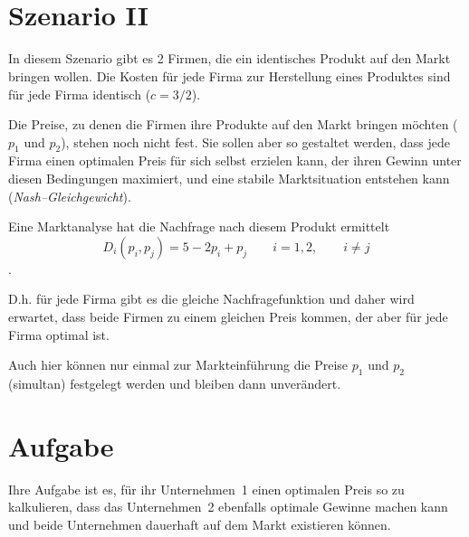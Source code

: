 \documentclass[paper=a4,notitlepage,parskip=half,plainheadsepline]{scrartcl}
\newif\ifloesung
\begin{document}
        \begin{tcolorbox}[toptitle=3mm,bottomtitle=3mm,title=\centering{{\lf J}\hfil FI Anwendungsentwicklung / Duales Studium\hfil {\lf J}},
          drop lifted shadow=gray]
        \centering{\vspace{0.5cm}\LARGE Programmierübung %
        \ifloesung (mit Musterlösung)\fi}\\[0.3cm]
        \\\vspace{0.5cm}
        \end{tcolorbox}

\section{Szenario II}
In diesem Szenario gibt es 2 Firmen, die ein identisches Produkt auf den Markt bringen wollen.
Die Kosten für jede Firma zur Herstellung eines Produktes sind für jede Firma identisch ($c=3/2$).

Die Preise, zu denen die Firmen ihre Produkte auf den Markt bringen möchten ($p_1$ und $p_2$), stehen noch nicht fest.
Sie sollen aber so gestaltet werden, dass jede Firma einen optimalen Preis für sich selbst erzielen kann, der ihren Gewinn unter diesen Bedingungen maximiert, und eine stabile Marktsituation entstehen kann (\emph{Nash--Gleichgewicht}).

Eine Marktanalyse hat die Nachfrage nach diesem Produkt ermittelt $$D_i(p_i,p_j)=5 - 2 p_i + p_j \qquad i={1,2}, \qquad i\neq j$$.

D.h. für jede Firma gibt es die gleiche Nachfragefunktion und daher wird erwartet, dass beide Firmen zu einem gleichen Preis kommen, der aber für jede Firma optimal ist.

Auch hier können nur einmal zur Markteinführung die Preise $p_1$ und $p_2$ (simultan) festgelegt werden und bleiben dann unverändert.

\section{Aufgabe}
Ihre Aufgabe ist es, für ihr Unternehmen~1 einen optimalen Preis so zu kalkulieren, dass das Unternehmen~2 ebenfalls optimale Gewinne machen kann und beide Unternehmen dauerhaft auf dem Markt existieren können. 
\end{document}
